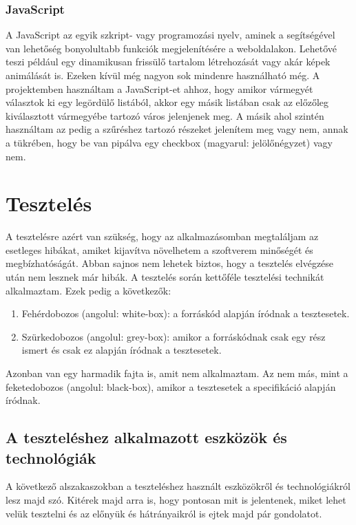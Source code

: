 \documentclass[]{thesis-ekf}
\theoremstyle{definition}
\theoremstyle{remark}
\begin{document}
	\subsection{JavaScript}\label{javascript}
		A JavaScript az egyik szkript- vagy programozási nyelv, aminek a segítségével van lehetőség bonyolultabb funkciók megjelenítésére a weboldalakon. Lehetővé teszi például egy dinamikusan frissülő tartalom létrehozását vagy akár képek animálását is. Ezeken kívül még nagyon sok mindenre használható még. A projektemben használtam a JavaScript-et ahhoz, hogy amikor vármegyét választok ki egy legördülő listából, akkor egy másik listában csak az előzőleg kiválasztott vármegyébe tartozó város jelenjenek meg. A másik ahol szintén használtam az pedig a szűréshez tartozó részeket jelenítem meg vagy nem, annak a tükrében, hogy be van pipálva egy checkbox (magyarul: jelölőnégyzet) vagy nem.
		
	\chapter{Tesztelés}
		A tesztelésre azért van szükség, hogy az alkalmazásomban megtaláljam az esetleges hibákat, amiket kijavítva növelhetem a szoftverem minőségét és megbízhatóságát. Abban sajnos nem lehetek biztos, hogy a tesztelés elvégzése után nem lesznek már hibák. A tesztelés során kettőféle tesztelési technikát alkalmaztam. Ezek pedig a következők:
		\begin{enumerate}
			\item Fehérdobozos (angolul: white-box): a forráskód alapján íródnak a tesztesetek.
			\item Szürkedobozos (angolul: grey-box): amikor a forráskódnak csak egy rész ismert és csak ez alapján íródnak a tesztesetek.
		\end{enumerate}
		Azonban van egy harmadik fajta is, amit nem alkalmaztam. Az nem más, mint a feketedobozos (angolul: black-box), amikor a tesztesetek a specifikáció alapján íródnak.
		\cite[26-29.~oldal]{Kusper}
	\section{A teszteléshez alkalmazott eszközök és technológiák}
			A következő alszakaszokban a teszteléshez használt eszközökről és technológiákról lesz majd szó. Kitérek majd arra is, hogy pontosan mit is jelentenek, miket lehet velük tesztelni és az előnyük és hátrányaikról is ejtek majd pár gondolatot.
\end{document}
